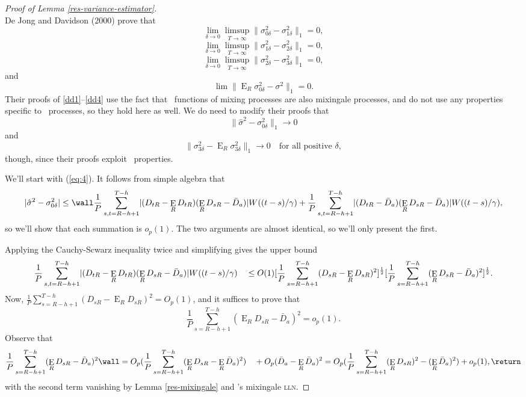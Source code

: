 \documentclass[11pt]{article}
\DeclareMathOperator{\E}{E}
\newcommand{\citepos}[1]{\citeauthor{#1}'s \citeyearpar{#1}}
\newcommand{\oosA}{\bar{D}_a}
\newcommand{\oosSum}[2]{\ensuremath{\sum_{#1=R-\h+#2}^{T-\h}}}
\newcommand{\h}{h}
\newcommand{\vWeight}{W((t-s)/\gamma)}
\newcommand{\varianceTermI}{\ensuremath{\sigma_{0\delta}^2}}
\newcommand{\varianceTermII}{\ensuremath{\sigma_{1\delta}^2}}
\newcommand{\varianceTermIII}{\ensuremath{\sigma_{2\delta}^{2}}}
\newcommand{\varianceTermIV}{\ensuremath{\sigma_{3\delta}^{2}}}
\newcommand{\varianceDiffA}{\ensuremath{\frac1{P} \oosSum{s,t}{1}
    \lvert (D_{tR} - \E_R D_{tR})(\E_R D_{sR} - \oosA) \rvert
    \vWeight}}
\newcommand{\varianceDiffAi}{\ensuremath{\frac1P \oosSum{s}{1}(\E_R
    D_{sR} - \oosA )^2}}
\newcommand{\varianceDiffAii}{\ensuremath{\frac1P \oosSum{s}{1}
    (D_{sR} - \E_R D_{sR})^2}}
\newcommand{\lln}{\textsc{lln}}
\begin{document}
\begin{proof}[Proof of Lemma \ref{res-variance-estimator}]
\begin{equation*}
\end{equation*}
De Jong and Davidson (2000) prove that
\begin{equation} \label{dd1}
\lim_{\delta\to0} \limsup_{T\to\infty} \lVert \varianceTermI -
\varianceTermII\rVert_1 = 0,
\end{equation}
\begin{equation} \label{dd2}
\lim_{\delta\to0} \limsup_{T\to\infty} \lVert \varianceTermII - \varianceTermIII
\rVert_1 = 0,
\end{equation}
\begin{equation} \label{dd3}
\lim_{\delta\to0} \limsup_{T\to\infty} \lVert \varianceTermIII - \varianceTermIV
\rVert_1 = 0,  
\end{equation}
and
\begin{equation} \label{dd4}
\lim \lVert \E_R \varianceTermI - \sigma^2 \rVert_1 = 0.
\end{equation}
Their proofs of \eqref{dd1}--\eqref{dd4} use the fact that \ned\
functions of mixing processes are also mixingale processes, and do not
use any properties specific to \ned\ processes, so they hold here as
well.  We do need to modify their proofs that
\begin{equation}
  \label{eq:4} \lVert \hat{\sigma}^2 - \varianceTermI \rVert_1 \to 0
\end{equation}
and
\begin{equation}
  \label{eq:5} \lVert \varianceTermIV - \E_R \varianceTermIV \rVert_1
  \to 0 \quad \text{for all positive $\delta$},
\end{equation}
though, since their proofs exploit \ned\ properties.

We'll start with (\ref{eq:4}). It follows from simple algebra that
\[
\lvert \hat\sigma^2 - \varianceTermI \rvert \leq \wall
\varianceDiffA \\ +
\frac1{P} \oosSum{s,t}{1} \lvert (D_{tR} - \oosA)(\E_R D_{sR} - \oosA) \rvert
\vWeight,
\]
so we'll show that each summation is $o_p(1)$.  The two
arguments are almost identical, so we'll only present the first.

Applying the Cauchy-Scwarz inequality twice and simplifying gives the
upper bound
\[
\varianceDiffA \\ \quad \leq O(1) [\varianceDiffAii]^{\frac12} [\varianceDiffAi]^{\frac12}.
\]
Now,
$\frac1P \oosSum{s}{1}(D_{sR} - \E_R D_{sR})^2 = O_p(1)$, and it suffices to prove
that \[\varianceDiffAi = o_p(1).\]  Observe that
\[
\varianceDiffAi \wall =  O_p(\frac1P \oosSum{s}{1}(\E_{R}D_{sR} -
\E_R\oosA)^2) \\
\quad + O_p(\oosA - \E_R\oosA)^{2} \\
= O_p(\frac1P \oosSum{s}{1} (\E_RD_{sR})^2 - (\E_R\oosA)^2) + o_p(1),    \return
\]
with the second term vanishing by Lemma \ref{res-mixingale} and
\citepos{Dav:93} mixingale \lln.


\end{proof}
\end{document}
